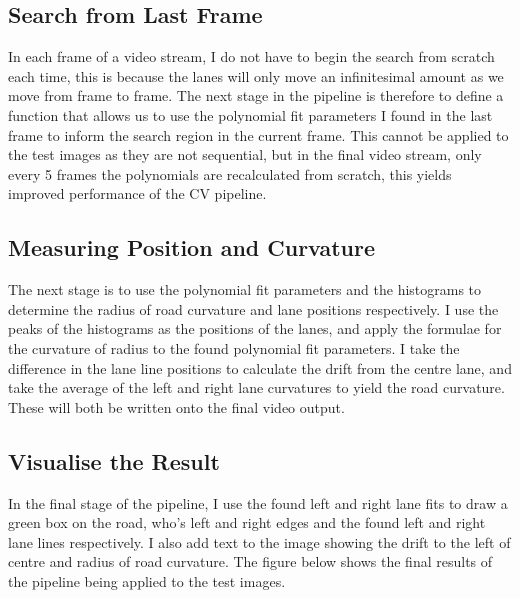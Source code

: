 \documentclass[letterpaper,12pt]{article}
\begin{document}
\subsection{Search from Last Frame}
In each frame of a video stream, I do not have to begin the search from scratch each time, this is because the lanes will only move an infinitesimal amount as we move from frame to frame. The next stage in the pipeline is therefore to define a function that allows us to use the polynomial fit parameters I found in the last frame to inform the search region in the current frame. This cannot be applied to the test images as they are not sequential, but in the final video stream, only every 5 frames the polynomials are recalculated from scratch, this yields improved performance of the CV pipeline. 
\subsection{Measuring Position and Curvature}
The next stage is to use the polynomial fit parameters and the histograms to determine the radius of road curvature and lane positions respectively. I use the peaks of the histograms as the positions of the lanes, and apply the formulae for the curvature of radius to the found polynomial fit parameters. I take the difference in the lane line positions to calculate the drift from the centre lane, and take the average of the left and right lane curvatures to yield the road curvature. These will both be written onto the final video output.
\subsection{Visualise the Result}
In the final stage of the pipeline, I use the found left and right lane fits to draw a green box on the road, who's left and right edges and the found left and right lane lines respectively. I also add text to the image showing the drift to the left of centre and radius of road curvature. The figure below shows the final results of the pipeline being applied to the test images.
\FloatBarrier
\begin{figure}
\centering
{}
\end{figure}
\FloatBarrier
\end{document}

